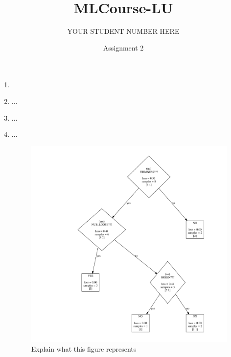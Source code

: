 \documentclass{article}
\title{MLCourse-LU}
\author{YOUR STUDENT NUMBER HERE}
\date{Assignment 2}
\begin{document}
\maketitle



\begin{enumerate}
    \item %
    
    \item ...%
    

    \item ... %
    
    \item ... %
    
    
    \begin{figure}[H]
        \centering
        \includegraphics[width=\linewidth]{avocado.pdf}
        \caption{Explain what this figure represents}
        \label{fig:bad tree}
    \end{figure}



\end{enumerate}
\end{document}
